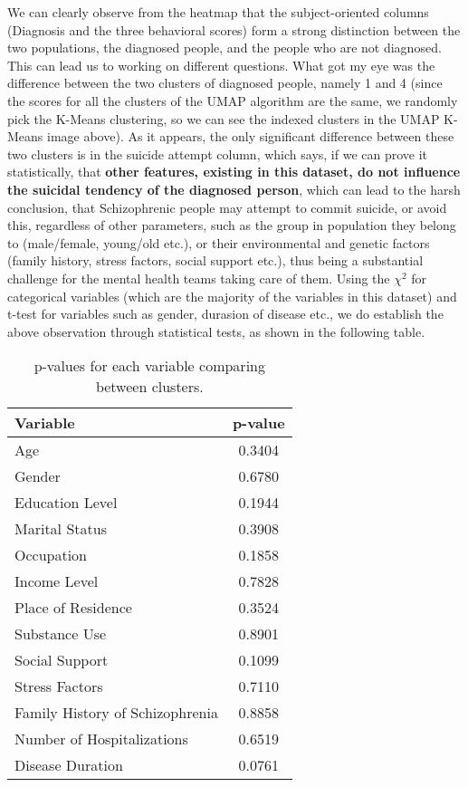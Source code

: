 \documentclass{article}
\begin{document}
\begin{figure}[H]
    \centering
\end{figure}

We can clearly observe from the heatmap that the subject-oriented columns (Diagnosis and the three behavioral scores) form a strong distinction between the two populations, the diagnosed people, and the people who are not diagnosed. This can lead us to working on different questions. What got my eye was the difference between the two clusters of diagnosed people, namely 1 and 4 (since the scores for all the clusters of the UMAP algorithm are the same, we randomly pick the K-Means clustering, so we can see the indexed clusters in the UMAP K-Means image above).
As it appears, the only significant difference between these two clusters is in the suicide attempt column, which says, if we can prove it statistically, that \textbf{other features, existing in this dataset, do not influence the suicidal tendency of the diagnosed person}, which can lead to the harsh conclusion, that Schizophrenic people may attempt to commit suicide, or avoid this, regardless of other parameters, such as the group in population they belong to (male/female, young/old etc.), or their environmental and genetic factors (family history, stress factors, social support etc.), thus being a substantial challenge for the mental health teams taking care of them. 
Using the $\chi^2$ for categorical variables (which are the majority of the variables in this dataset) and t-test for variables such as gender, durasion of disease etc., we do establish the above observation through statistical tests, as shown in the following table.
\begin{table}[h]
\centering
\begin{tabular}{|l|c|}
\hline
\textbf{Variable} & \textbf{p-value} \\
\hline
Age & 0.3404 \\
Gender & 0.6780 \\
Education Level & 0.1944 \\
Marital Status & 0.3908 \\
Occupation & 0.1858 \\
Income Level & 0.7828 \\
Place of Residence & 0.3524 \\
Substance Use & 0.8901 \\
Social Support & 0.1099 \\
Stress Factors & 0.7110 \\
Family History of Schizophrenia & 0.8858 \\
Number of Hospitalizations & 0.6519 \\
Disease Duration & 0.0761 \\
\hline
\end{tabular}
\caption{p-values for each variable comparing between clusters.}
\label{tab:p_values}
\end{table}
\end{document}
